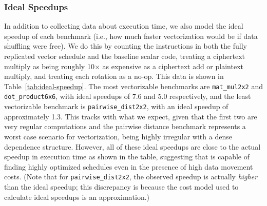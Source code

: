 \subsubsection*{Ideal Speedups}
In addition to collecting data about execution time, we also model the ideal speedup of each benchmark (i.e., how much faster vectorization would be if data shuffling were free).
We do this by counting the instructions in both the fully replicated vector schedule and the baseline scalar code, treating a ciphertext multiply as being roughly 10$\times$ as expensive as a ciphertext add or plaintext multiply, and treating each rotation as a no-op. 
This data is shown in Table~\ref{tab:ideal-speedup}.
The most vectorizable benchmarks are \texttt{mat\_mul2x2} and \texttt{dot\_product6x6}, with ideal speedups of 7.6 and 5.0 respectively, and the least vectorizable benchmark is \texttt{pairwise\_dist2x2}, with an ideal speedup of approximately 1.3.
This tracks with what we expect, given that the first two are very regular computations and the pairwise distance benchmark represents a worst case scenario for vectorization, being highly irregular with a dense dependence structure.
However, all of these ideal speedups are close to the actual speedup in execution time as shown in the table, suggesting that \system is capable of finding highly optimized schedules even in the presence of high data movement costs. (Note that for \texttt{pairwise\_dist2x2}, the observed speedup is actually {\em higher} than the ideal speedup; this discrepancy is because the cost model used to calculate ideal speedups is an approximation.)


